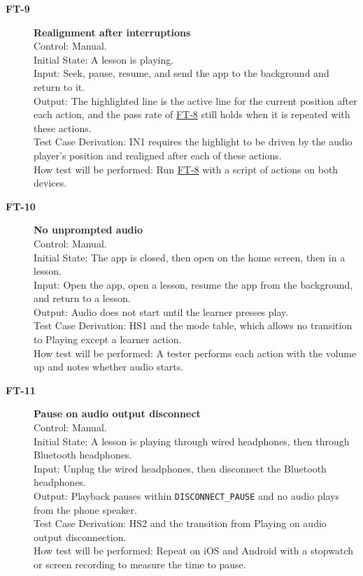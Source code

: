 \documentclass[12pt, titlepage]{article}
\newcommand{\tid}[1]{\hypertarget{test:#1}{\textbf{#1}}}
\newcommand{\tref}[1]{\hyperlink{test:#1}{#1}}
\newcommand{\cn}[1]{\texttt{#1}}
\begin{document}
\begin{description}
\item[\tid{FT-9}] \textbf{Realignment after interruptions}\\
Control: Manual.\\
Initial State: A lesson is playing.\\
Input: Seek, pause, resume, and send the app to the background and return to
it.\\
Output: The highlighted line is the active line for the current position after
each action, and the pass rate of \tref{FT-8} still holds when it is repeated
with these actions.\\
Test Case Derivation: IN1 requires the highlight to be driven by the audio
player's position and realigned after each of these actions.\\
How test will be performed: Run \tref{FT-8} with a script of actions on both
devices.

\item[\tid{FT-10}] \textbf{No unprompted audio}\\
Control: Manual.\\
Initial State: The app is closed, then open on the home screen, then in a
lesson.\\
Input: Open the app, open a lesson, resume the app from the background, and
return to a lesson.\\
Output: Audio does not start until the learner presses play.\\
Test Case Derivation: HS1 and the mode table, which allows no transition to
Playing except a learner action.\\
How test will be performed: A tester performs each action with the volume up
and notes whether audio starts.

\item[\tid{FT-11}] \textbf{Pause on audio output disconnect}\\
Control: Manual.\\
Initial State: A lesson is playing through wired headphones, then through
Bluetooth headphones.\\
Input: Unplug the wired headphones, then disconnect the Bluetooth headphones.\\
Output: Playback pauses within \cn{DISCONNECT\_PAUSE} and no audio plays from the
phone speaker.\\
Test Case Derivation: HS2 and the transition from Playing on audio output
disconnection.\\
How test will be performed: Repeat on iOS and Android with a stopwatch or screen
recording to measure the time to pause.


\end{description}
\end{document}
